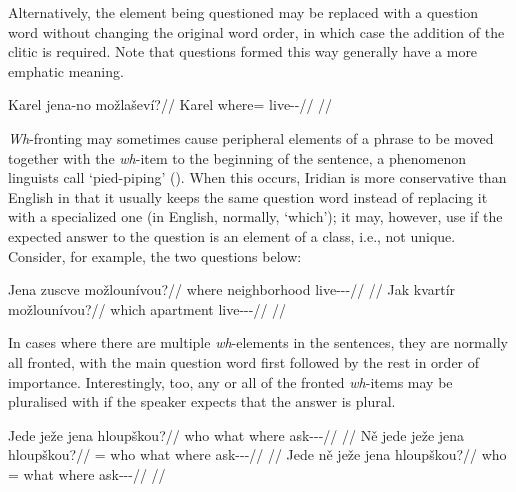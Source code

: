 Alternatively, the element being questioned may be replaced with a question word
without changing the original word order, in which case the addition of the
clitic  is required. Note that questions formed this way generally have
a more emphatic meaning.

\pex
\begingl
\gla Karel jena-no možlaševí?//
\glb Karel where=\Q{} live-\Av{}-\Cont{}//
\glft {}//
\endgl
\xe


\emph{Wh}-fronting may sometimes cause peripheral elements of a phrase to be
moved together with the \emph{wh}-item to the beginning of the sentence, a
phenomenon linguists call `pied-piping' (\cite[263-4]{ross1967}). When this
occurs, Iridian is more conservative than English in that it usually keeps the
same question word instead of replacing it with a specialized one (in English,
normally, `which'); it may, however, use  if the expected
answer to the question is an element of a class, i.e., not unique. Consider, for
example, the two questions below:

\pex
\a
\begingl
\gla Jena zuscve možlounívou?//
\glb where neighborhood live-\Lv{}-\Cont{}-\Nz{}//
\glft {}//
\endgl
\a
\begingl
\gla Jak kvartír možlounívou?//
\glb which apartment live-\Lv{}-\Cont{}-\Nz{}//
\glft {}//
\endgl
\xe

In cases where there are multiple \emph{wh}-elements in the sentences, they are
normally all fronted, with the main question word first followed by the rest in
order of importance. Interestingly, too, any or all of the fronted
\emph{wh}-items may be pluralised with  if the speaker expects that the
answer is plural.

\pex
\a\begingl
\gla Jede ježe jena hloupškou?//
\glb who what where ask-\Av{}-\Pf{}-\Nz{}//
\glft {}//
\endgl
\a\begingl
\gla Ně jede ježe jena hloupškou?//
\glb \Pl{}= who what where ask-\Av{}-\Pf{}-\Nz{}//
\glft {}//
\endgl
\a\begingl
\gla Jede ně ježe jena hloupškou?//
\glb who \Pl{}= what where ask-\Av{}-\Pf{}-\Nz{}//
\glft {}//
\endgl
\xe

